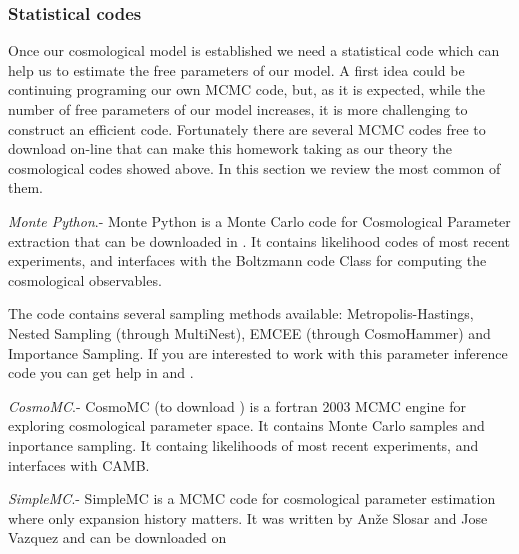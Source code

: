 \documentclass[onecolumn,           %
               showpacs,            %
               preprintnumbers,     %
               aps,                 %
               prl,          	    %
               letterpaper,             %
               superscriptaddress,      %
               nofootinbib,         %
               tightenlines,        %
               floats,floatfix      %
               ,usenatbib,
               ]{revtex4-1}
\begin{document}


\subsubsection{Statistical codes}

Once our cosmological model is established we need a statistical code which can help us to estimate the free parameters of our model. A first idea could be continuing programing our own MCMC code, but, as it is expected, while the number of free parameters of our model increases, it is more challenging to construct an efficient code. Fortunately there are several MCMC codes free to download on-line that can make this homework taking as our theory the cosmological codes showed above. In this section we review the most common of them.

\textit{Monte Python}.-
Monte Python is a Monte Carlo code for Cosmological Parameter extraction  that can be downloaded in \cite{MP1}. It contains likelihood codes of most recent experiments, and interfaces with the Boltzmann code Class for computing the cosmological observables.

The code contains several sampling methods available: Metropolis-Hastings, Nested Sampling (through MultiNest), EMCEE (through CosmoHammer) and Importance Sampling. If you are interested to work with this parameter inference code you can get help in \cite{mont1} and \cite{MP2}.

\textit{CosmoMC}.- CosmoMC (to download \cite{cosmomc}) is a fortran 2003 MCMC engine for exploring cosmological parameter space. It contains Monte Carlo samples and inportance sampling. It containg likelihoods of most recent experiments, and interfaces with CAMB.

\textit{SimpleMC}.- SimpleMC is a MCMC code for cosmological parameter estimation where only expansion history matters. It was written by Anže Slosar and Jose Vazquez and can be downloaded on \cite{simplemc}
\end{document}
